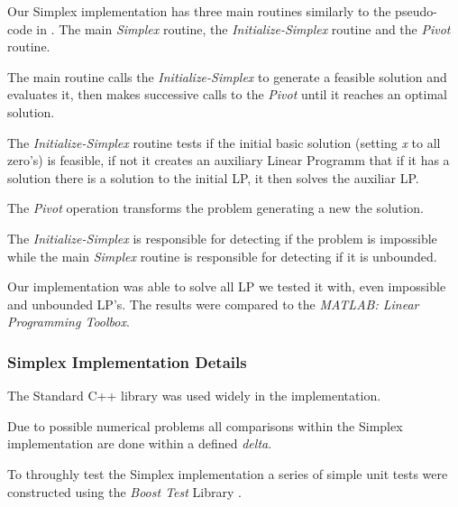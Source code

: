 Our Simplex implementation has three main routines similarly to the pseudo-code in \cite{Cormen}. The main \emph{Simplex} routine, the \emph{Initialize-Simplex} routine and the \emph{Pivot} routine.

The main routine calls the \emph{Initialize-Simplex} to generate a feasible solution and evaluates it, then makes successive calls to the \emph{Pivot} until it reaches an optimal solution.

The \emph{Initialize-Simplex} routine tests if the initial basic solution (setting \emph{x} to all zero's) is feasible, if not it creates an auxiliary Linear Programm that if it has a solution there is a solution to the initial LP, it then solves the auxiliar LP.

The \emph{Pivot} operation transforms the problem generating a new the solution.

The \emph{Initialize-Simplex} is responsible for detecting if the problem is impossible while the main \emph{Simplex} routine is responsible for detecting if it is unbounded.

Our implementation was able to solve all LP we tested it with, even impossible and unbounded LP's. The results were compared to the \emph{MATLAB: Linear Programming Toolbox}.

\subsubsection{Simplex Implementation Details}
\label{subs:SimplexImplementationDetails}

The Standard C++ library was used widely in the implementation. %

Due to possible numerical problems all comparisons within the Simplex implementation are done within a defined \emph{delta}.

To throughly test the Simplex implementation a series of simple unit tests were constructed using the \emph{Boost Test} Library \cite{BoostSite}.
